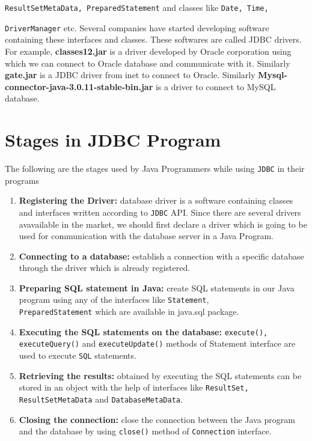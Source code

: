 \documentclass[11pt,a4paper]{article}
\begin{document}
\texttt{ResultSetMetaData, PreparedStatement} and classes like \texttt{Date, Time,}

\texttt{DriverManager} etc. Several companies have started developing software containing these interfaces and classes. These softwares are called JDBC drivers. For example, \textbf{classes12.jar} is a driver developed by Oracle corporation using which we can connect to Oracle database and communicate with it. Similarly \textbf{gate.jar} is a JDBC driver from inet to connect to Oracle. Similarly \textbf{Mysql-connector-java-3.0.11-stable-bin.jar} is a driver to connect to MySQL database. 

\section*{Stages in JDBC Program}
The following are the stages used by Java Programmers while using \texttt{JDBC} in their programs
\begin{enumerate}
\item \textbf{Registering the Driver:} database driver is a software containing classes and interfaces written according to \texttt{JDBC} API. Since there are several drivers avavailable in the market, we should first declare a driver which is going to be used for communication with the database server in a Java Program.
\item \textbf{Connecting to a database:} establish a connection with a specific database through the driver which is already registered.
\item \textbf{Preparing SQL statement in Java:} create SQL statements in our Java program using any of the interfaces like \texttt{Statement}, \\
\texttt{PreparedStatement} which are available in java.sql package.
\item \textbf{Executing the SQL statements on the database:} \texttt{execute(), executeQuery()} and \texttt{executeUpdate()} methods of Statement interface are used to execute \texttt{SQL} statements.
\item \textbf{Retrieving the results:} obtained by executing the SQL statements can be stored in an object with the help of interfaces like \texttt{ResultSet, ResultSetMetaData} and \texttt{DatabaseMetaData}.
\item \textbf{Closing the connection:} close the connection between the Java program and the database by using \texttt{close()} method of \texttt{Connection} interface.
\end{enumerate}
\end{document}
